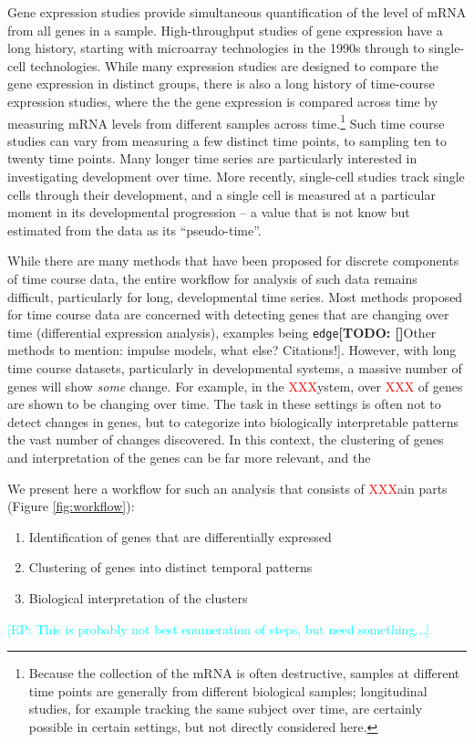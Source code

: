 \documentclass[11 pts]{article}
\makeatletter
\newcommand{\todo}[1]{\textbf{[TODO\@: #1]}}
\newcommand{\ep}[1]{\textcolor{cyan}{[EP\@: #1]}}
\newcommand{\xxx}[1]{\textcolor{red}{XXX}}
\makeatother
\begin{document}
Gene expression studies provide simultaneous quantification of the level of mRNA from all genes in a sample. High-throughput studies of gene expression have a long history, starting with microarray technologies in the 1990s through to single-cell technologies. While many expression studies are designed to compare the gene expression in distinct groups, there is also a long history of time-course expression studies, where the the gene expression is compared across time by measuring mRNA levels from different samples across time.\footnote{Because the collection of the mRNA is often destructive, samples at different time points are generally from different biological samples; longitudinal studies, for example tracking the same subject over time, are certainly possible in certain settings, but not directly considered here.} Such time course studies can vary from measuring a few distinct time points, to sampling ten to twenty time points. Many longer time series are particularly interested in investigating development over time. More recently, single-cell studies track single cells through their development, and a single cell is measured at a particular moment in its developmental progression -- a value that is not know but estimated from the data as its ``pseudo-time''.

While there are many methods that have been proposed for discrete components of time course data, the entire workflow for analysis of such data remains difficult, particularly for long, developmental time series. Most methods proposed for time course data are concerned with detecting genes that are changing over time (differential expression analysis), examples being \texttt{edge}\todo[Other methods to mention: impulse models, what else? Citations!]. However, with long time course datasets, particularly in developmental systems, a massive number of genes will show \emph{some} change. For example, in the \xxx system, over \xxx\% of genes are shown to be changing over time. The task in these settings is often not to detect changes in genes, but to categorize into biologically interpretable patterns the vast number of changes discovered. In this context, the clustering of genes and interpretation of the genes can be far more relevant, and the 

We present here a workflow for such an analysis that consists of \xxx main parts (Figure \ref{fig:workflow}):
\begin{enumerate}
	\item Identification of genes that are differentially expressed
	\item Clustering of genes into distinct temporal patterns
	\item Biological interpretation of the clusters
\end{enumerate}
\ep{This is probably not best enumeration of steps, but need something...}
\end{document}
